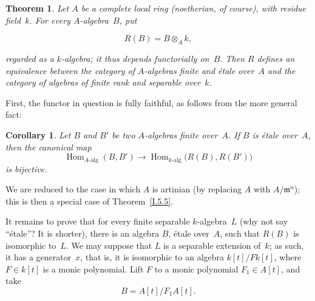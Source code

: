 \documentclass[11pt,oneside]{amsbook}
\newtheorem{theorem}[proposition]{Theorem}
\newtheorem{corollary}[proposition]{Corollary}
\begin{document}
\begin{theorem}
\label{I.6.1}
Let \(A\) be a complete local ring (noetherian, of course), with residue
field~\(k\).  For every \(A\)-algebra~\(B\), put

\[
  R(B)=B\otimes_A k,
\]

regarded as a \(k\)-algebra; it thus depends functorially on~\(B\).  Then \(R\)
defines an \emph{equivalence} between the category of \(A\)-algebras
\emph{finite and étale over~\(A\)} and the category of algebras
\emph{of finite rank and separable} over~\(k\).
\end{theorem}

First, the functor in question is fully faithful, as follows from the more
general fact:

\begin{corollary}
\label{I.6.2}
Let \(B\) and \(B'\) be two \(A\)-algebras finite over~\(A\).  If \(B\) is
étale over~\(A\), then the canonical map
\[
  \operatorname{Hom}_{A\text{-alg}}(B,B')
  \longrightarrow
  \operatorname{Hom}_{k\text{-alg}}\bigl(R(B),R(B')\bigr)
\]
is bijective.
\end{corollary}

We are reduced to the case in which \(A\) is artinian (by replacing \(A\) with
\(A/\mathfrak m^n\)); this is then a special case of
Theorem~\ref{I.5.5}.

It remains to prove that for every finite separable \(k\)-algebra~\(L\)
(why not say ``étale''? It is shorter), there is an algebra \(B\), étale
over~\(A\), such that \(R(B)\) is isomorphic to~\(L\).  We may suppose that
\(L\) is a separable extension of~\(k\); as such, it has a generator~\(x\),
that is, it is isomorphic to an algebra \(k[t]/F k[t]\), where
\(F\in k[t]\) is a monic polynomial.  Lift \(F\) to a monic polynomial
\(F_1\in A[t]\), and take
\[
  B=A[t]/F_1A[t].
\]
\end{document}
